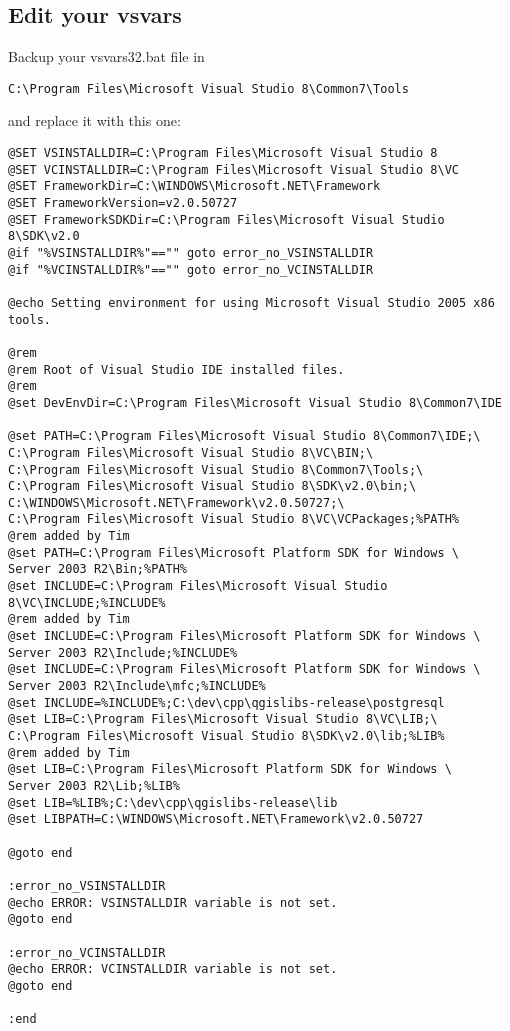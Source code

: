 \subsection{Edit your vsvars}
Backup your vsvars32.bat file in 

\begin{verbatim}
C:\Program Files\Microsoft Visual Studio 8\Common7\Tools
\end{verbatim}

and replace it with this one:

\begin{verbatim}
@SET VSINSTALLDIR=C:\Program Files\Microsoft Visual Studio 8
@SET VCINSTALLDIR=C:\Program Files\Microsoft Visual Studio 8\VC
@SET FrameworkDir=C:\WINDOWS\Microsoft.NET\Framework
@SET FrameworkVersion=v2.0.50727
@SET FrameworkSDKDir=C:\Program Files\Microsoft Visual Studio 8\SDK\v2.0
@if "%VSINSTALLDIR%"=="" goto error_no_VSINSTALLDIR
@if "%VCINSTALLDIR%"=="" goto error_no_VCINSTALLDIR

@echo Setting environment for using Microsoft Visual Studio 2005 x86 tools.

@rem
@rem Root of Visual Studio IDE installed files.
@rem
@set DevEnvDir=C:\Program Files\Microsoft Visual Studio 8\Common7\IDE

@set PATH=C:\Program Files\Microsoft Visual Studio 8\Common7\IDE;\
C:\Program Files\Microsoft Visual Studio 8\VC\BIN;\
C:\Program Files\Microsoft Visual Studio 8\Common7\Tools;\
C:\Program Files\Microsoft Visual Studio 8\SDK\v2.0\bin;\
C:\WINDOWS\Microsoft.NET\Framework\v2.0.50727;\
C:\Program Files\Microsoft Visual Studio 8\VC\VCPackages;%PATH%
@rem added by Tim
@set PATH=C:\Program Files\Microsoft Platform SDK for Windows \
Server 2003 R2\Bin;%PATH%
@set INCLUDE=C:\Program Files\Microsoft Visual Studio 8\VC\INCLUDE;%INCLUDE%
@rem added by Tim
@set INCLUDE=C:\Program Files\Microsoft Platform SDK for Windows \
Server 2003 R2\Include;%INCLUDE%
@set INCLUDE=C:\Program Files\Microsoft Platform SDK for Windows \
Server 2003 R2\Include\mfc;%INCLUDE%
@set INCLUDE=%INCLUDE%;C:\dev\cpp\qgislibs-release\postgresql
@set LIB=C:\Program Files\Microsoft Visual Studio 8\VC\LIB;\
C:\Program Files\Microsoft Visual Studio 8\SDK\v2.0\lib;%LIB%
@rem added by Tim
@set LIB=C:\Program Files\Microsoft Platform SDK for Windows \
Server 2003 R2\Lib;%LIB%
@set LIB=%LIB%;C:\dev\cpp\qgislibs-release\lib
@set LIBPATH=C:\WINDOWS\Microsoft.NET\Framework\v2.0.50727

@goto end

:error_no_VSINSTALLDIR
@echo ERROR: VSINSTALLDIR variable is not set. 
@goto end

:error_no_VCINSTALLDIR
@echo ERROR: VCINSTALLDIR variable is not set. 
@goto end

:end

\end{verbatim}

